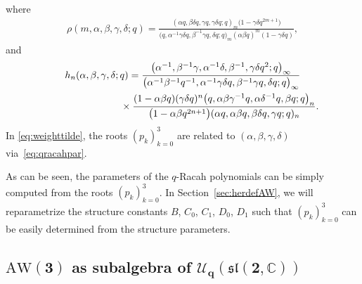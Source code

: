 \documentclass[10pt,a4paper]{amsart}
\numberwithin{equation}{section}
\newcommand{\aw}{\mathrm{AW}\!\left(3\right)}
\begin{document}
where
\begin{gather}
	\rho(m,\alpha,\beta,\gamma,\delta;q)= \frac{(\alpha q,\beta\delta q, \gamma q, \gamma\delta q;q)_m\big(1-\gamma\delta q^{2m+1}\big)}{\big(q,\alpha^{-1}\gamma\delta q, \beta^{-1}\gamma q, \delta q;q\big)_m(\alpha\beta q)^m(1-\gamma\delta q)},\label{eq:qracahweight}
\end{gather}
and
\begin{gather}
h_n(\alpha,\beta,\gamma,\delta;q)=\frac{\big(\alpha^{-1},\beta^{-1}\gamma,\alpha^{-1}\delta,\beta^{-1},\gamma\delta q^2;q\big)_\infty}{\big(\alpha^{-1}\beta^{-1} q^{-1},\alpha^{-1}\gamma\delta q, \beta^{-1}\gamma q,\delta q;q\big)_\infty}\nonumber\\
\hphantom{h_n(\alpha,\beta,\gamma,\delta;q)=}{}
\times\frac{(1-\alpha\beta q)(\gamma\delta q)^n \big(q,\alpha\beta\gamma^{-1}q,\alpha\delta^{-1}q,\beta q;q\big)_n}{\big(1-\alpha\beta q^{2n+1}\big)(\alpha q,\alpha\beta q,\beta\delta q,\gamma q;q)_n}. \label{eq:qracahnorm}
\end{gather}
In \eqref{eq:weighttilde}, the roots $(p_k)_{k=0}^3$ are related to $(\alpha,\beta,\gamma,\delta)$ via~\eqref{eq:qracahpar}.

As can be seen, the parameters of the $q$-Racah polynomials can be simply computed from the roots $(p_k)_{k=0}^3$. In Section~\ref{sec:herdefAW}, we will reparametrize the structure constants $B$, $C_0$, $C_1$, $D_0$, $D_1$ such that $(p_k)_{k=0}^3$ can be easily determined from the structure parameters.

\subsection[AW(3) as subalgebra of U\_q(sl(2,C))]{$\boldsymbol{\aw}$ as subalgebra of $\boldsymbol{{\mathcal{U}_{q}(\mathfrak{sl}(2,\mathbb C))}}$}\label{sec:uq}
\end{document}
